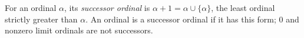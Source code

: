 
For an ordinal $\alpha$, its \emph{successor ordinal} is $\alpha+1=\alpha\cup\{\alpha\}$, the least ordinal strictly greater than $\alpha$. An ordinal is a successor ordinal if it has this form; $0$ and nonzero limit ordinals are not successors.
